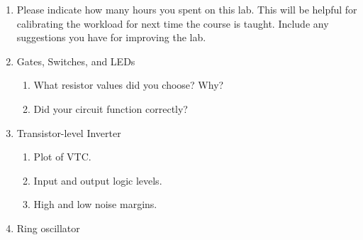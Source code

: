 \documentclass{e85}
\date{2019 February 4 (Monday)}
\author{}
\begin{document}
\begin{enumerate}
\item Please indicate how many hours you spent on this lab.  This will
  be helpful for calibrating the workload for next time the course is
  taught.  Include any suggestions you have for improving the lab.

  \begin{solution}

  \end{solution}

\item Gates, Switches, and LEDs
  \begin{enumerate}
  \item What resistor values did you choose?  Why?

    \begin{solution}

    \end{solution}

  \item Did your circuit function correctly?

    \begin{solution}

    \end{solution}
  \end{enumerate}

\item Transistor-level Inverter
  \begin{enumerate}
  \item Plot of VTC.

    \begin{solution}

    \end{solution}

  \item Input and output logic levels.

    \begin{solution}

    \end{solution}

  \item High and low noise margins.

    \begin{solution}

    \end{solution}
  \end{enumerate}

\item Ring oscillator


\end{enumerate}
\end{document}

